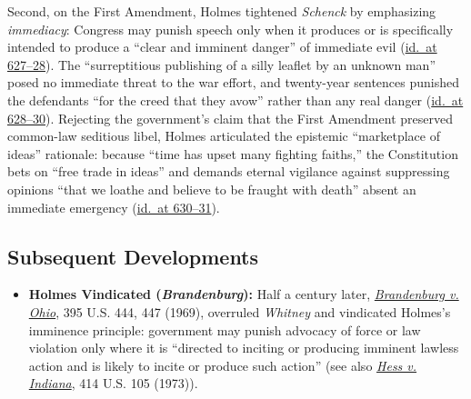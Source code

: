 \documentclass[12pt]{article}
\begin{document}
Second, on the First Amendment, Holmes tightened \emph{Schenck} by emphasizing \emph{immediacy}: Congress may punish speech only when it produces or is specifically intended to produce a ``clear and imminent danger'' of immediate evil (\href{https://supreme.justia.com/cases/federal/us/250/616/}{id.\ at 627--28}). The ``surreptitious publishing of a silly leaflet by an unknown man'' posed no immediate threat to the war effort, and twenty-year sentences punished the defendants ``for the creed that they avow'' rather than any real danger (\href{https://supreme.justia.com/cases/federal/us/250/616/}{id.\ at 628--30}). Rejecting the government's claim that the First Amendment preserved common-law seditious libel, Holmes articulated the epistemic ``marketplace of ideas'' rationale: because ``time has upset many fighting faiths,'' the Constitution bets on ``free trade in ideas'' and demands eternal vigilance against suppressing opinions ``that we loathe and believe to be fraught with death'' absent an immediate emergency (\href{https://supreme.justia.com/cases/federal/us/250/616/}{id.\ at 630--31}).

\subsection{Subsequent Developments}

\begin{itemize}

\item \textbf{Holmes Vindicated (\textit{Brandenburg}):} Half a century later, \href{https://supreme.justia.com/cases/federal/us/395/444/}{\emph{Brandenburg v. Ohio}}, 395 U.S. 444, 447 (1969), overruled \emph{Whitney} and vindicated Holmes's imminence principle: government may punish advocacy of force or law violation only where it is ``directed to inciting or producing imminent lawless action and is likely to incite or produce such action'' (see also \href{https://supreme.justia.com/cases/federal/us/414/105/}{\emph{Hess v. Indiana}}, 414 U.S. 105 (1973)).

\end{itemize}
\end{document}
